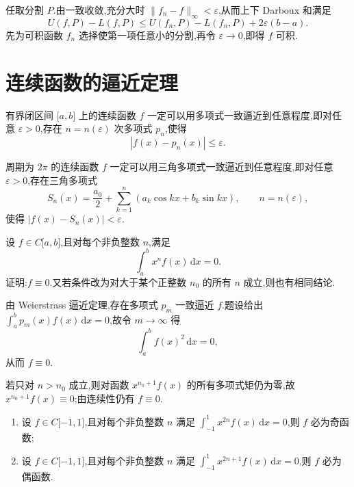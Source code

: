 \begin{solution}
    任取分割 $P$.由一致收敛,充分大时 $\|f_n-f\|_\infty<\varepsilon$,从而上下 Darboux 和满足
    \[
        U(f,P)-L(f,P)
        \leq U(f_n,P)-L(f_n,P)+2\varepsilon(b-a).
    \]
    先为可积函数 $f_n$ 选择使第一项任意小的分割,再令 $\varepsilon\to0$,即得 $f$ 可积.
\end{solution}


\newpage

\section{连续函数的逼近定理}

\begin{proposition}
    有界闭区间 $\lbrack a,b\rbrack$ 上的连续函数 $f$ 一定可以用多项式一致逼近到任意程度,即对任意 $\varepsilon>0$,存在 $n=n(\varepsilon)$ 次多项式 $p_n$,使得
    \[
        |f(x)-p_n(x)|\leq\varepsilon.
    \]
\end{proposition}

\begin{proposition}
    周期为 $2\pi$ 的连续函数 $f$ 一定可以用三角多项式一致逼近到任意程度,即对任意 $\varepsilon>0$,存在三角多项式
    \[
        S_n(x)=\dfrac{a_0}{2}+\sum\limits_{k=1}^{n}(a_k\cos kx+b_k\sin kx),
        \qquad n=n(\varepsilon),
    \]
    使得 $|f(x)-S_n(x)|<\varepsilon$.
\end{proposition}

\begin{example}
    设 $f\in C\lbrack a,b\rbrack$,且对每个非负整数 $n$,满足
    \[
        \displaystyle\int_a^bx^nf(x)\,\mathrm{d}x=0.
    \]
    证明:$f\equiv0$.又若条件改为对大于某个正整数 $n_0$ 的所有 $n$ 成立,则也有相同结论.
\end{example}
\exampleblank

\begin{solution}
    由 Weierstrass 逼近定理,存在多项式 $p_m$ 一致逼近 $f$.题设给出
    $\displaystyle\int_a^bp_m(x)f(x)\,\mathrm{d}x=0$,故令 $m\to\infty$ 得
    \[
        \displaystyle\int_a^bf(x)^2\,\mathrm{d}x=0,
    \]
    从而 $f\equiv0$.

    若只对 $n>n_0$ 成立,则对函数 $x^{n_0+1}f(x)$ 的所有多项式矩仍为零,故
    $x^{n_0+1}f(x)\equiv0$;由连续性仍有 $f\equiv0$.
\end{solution}

\begin{example}
    \begin{enumerate}
        \item 设 $f\in C\lbrack -1,1\rbrack$,且对每个非负整数 $n$ 满足 $\displaystyle\int_{-1}^{1}x^{2n}f(x)\,\mathrm{d}x=0$,则 $f$ 必为奇函数;
        \item 设 $f\in C\lbrack -1,1\rbrack$,且对每个非负整数 $n$ 满足 $\displaystyle\int_{-1}^{1}x^{2n+1}f(x)\,\mathrm{d}x=0$,则 $f$ 必为偶函数.
    \end{enumerate}
\end{example}
\exampleblank

